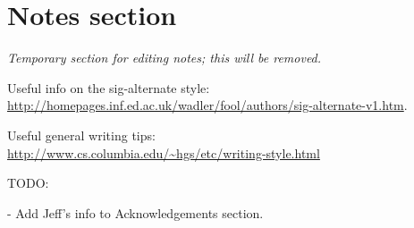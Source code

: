 \section{Notes section}

\emph{Temporary section for editing notes; this will be removed.}

Useful info on the sig-alternate style: \\
\url{http://homepages.inf.ed.ac.uk/wadler/fool/authors/sig-alternate-v1.htm}.

Useful general writing tips: \\
\url{http://www.cs.columbia.edu/~hgs/etc/writing-style.html}



TODO:

 - Add Jeff's info to Acknowledgements section.
